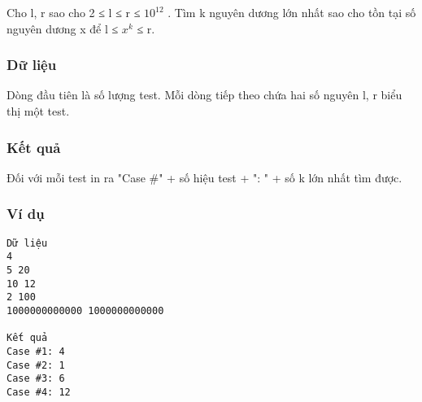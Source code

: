 



   Cho l, r sao cho 2 ≤ l ≤ r ≤ $10^{12}$   . Tìm k nguyên dương lớn nhất sao cho tồn tại số nguyên dương x để l ≤ $x^{k}$   ≤ r.  

\subsubsection{   Dữ liệu  }

   Dòng đầu tiên là số lượng test. Mỗi dòng tiếp theo chứa hai số nguyên l, r biểu thị một test.  

\subsubsection{   Kết quả  }

   Đối với mỗi test in ra "Case \#" + số hiệu test + ": " + số k lớn nhất tìm được.  

\subsubsection{   Ví dụ  }
\begin{verbatim}
Dữ liệu
4
5 20
10 12
2 100
1000000000000 1000000000000

Kết quả
Case #1: 4
Case #2: 1
Case #3: 6
Case #4: 12
\end{verbatim}
